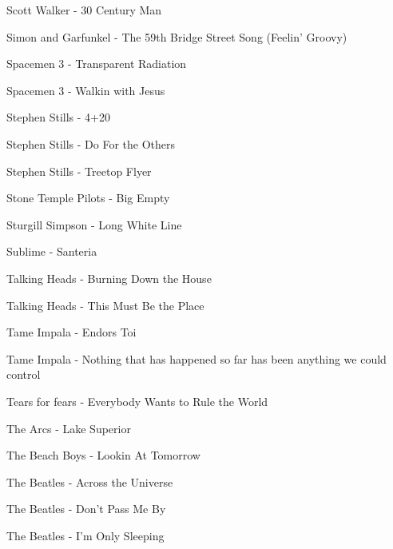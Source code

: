Scott Walker - 30 Century Man \dotfill \pageref{30 Century Man - Scott Walker} 

Simon and Garfunkel - The 59th Bridge Street Song (Feelin' Groovy) \dotfill \pageref{The 59th Bridge Street Song (Feelin' Groovy) - Simon and Garfunkel} 

Spacemen 3 - Transparent Radiation \dotfill \pageref{Transparent Radiation - Spacemen 3} 

Spacemen 3 - Walkin with Jesus \dotfill \pageref{Walkin with Jesus - Spacemen 3} 

Stephen Stills - 4+20 \dotfill \pageref{4+20 - Stephen Stills} 

Stephen Stills - Do For the Others \dotfill \pageref{Do For the Others - Stephen Stills} 

Stephen Stills - Treetop Flyer \dotfill \pageref{Treetop Flyer - Stephen Stills} 

Stone Temple Pilots - Big Empty \dotfill \pageref{Big Empty - Stone Temple Pilots} 

Sturgill Simpson - Long White Line \dotfill \pageref{Long White Line - Sturgill Simpson} 

Sublime - Santeria \dotfill \pageref{Santeria - Sublime} 

Talking Heads - Burning Down the House \dotfill \pageref{Burning Down the House - Talking Heads} 

Talking Heads - This Must Be the Place \dotfill \pageref{This Must Be the Place - Talking Heads} 

Tame Impala - Endors Toi \dotfill \pageref{Endors Toi - Tame Impala} 

Tame Impala - Nothing that has happened so far has been anything we could control \dotfill \pageref{Nothing that has happened so far has been anything we could control - Tame Impala} 

Tears for fears - Everybody Wants to Rule the World \dotfill \pageref{Everybody Wants to Rule the World - Tears for fears} 

The Arcs - Lake Superior \dotfill \pageref{Lake Superior - The Arcs} 

The Beach Boys - Lookin At Tomorrow \dotfill \pageref{Lookin At Tomorrow - The Beach Boys} 

The Beatles - Across the Universe \dotfill \pageref{Across the Universe - The Beatles} 

The Beatles - Don't Pass Me By \dotfill \pageref{Don't Pass Me By - The Beatles} 

The Beatles - I'm Only Sleeping \dotfill \pageref{I'm Only Sleeping - The Beatles} 


